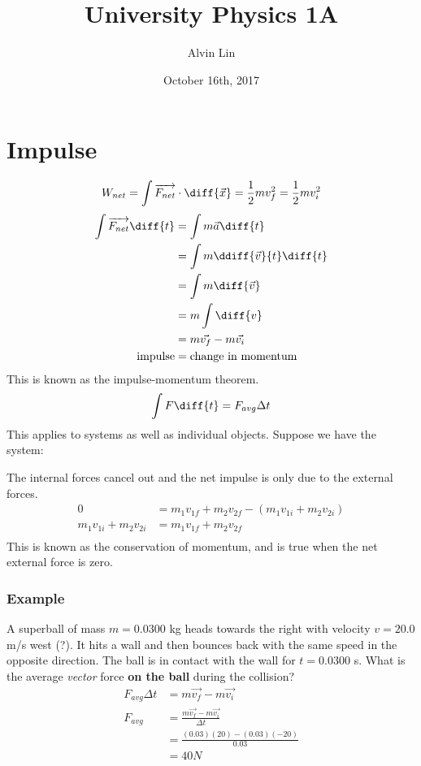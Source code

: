 \documentclass{math}
\title{University Physics 1A}
\author{Alvin Lin}
\date{October 16th, 2017}
\begin{document}
\maketitle

\section*{Impulse}
\[ W_{net} = \int\overrightarrow{F_{net}}\cdot\diff{\vec{x}} =
  \frac{1}{2}mv_f^2 = \frac{1}{2}mv_i^2 \]
\begin{align*}
  \int\overrightarrow{F_{net}}\diff{t} &= \int m\vec{a}\diff{t} \\
  &= \int m\ddiff{\vec{v}}{t}\diff{t} \\
  &= \int m\diff{\vec{v}} \\
  &= m\int\diff{v} \\
  &= m\vec{v_f}-m\vec{v_i} \\
  \text{impulse} &= \text{change in momentum}
\end{align*}
This is known as the impulse-momentum theorem.
\[ \int F\diff{t} = F_{avg}\Delta{t} \]
This applies to systems as well as individual objects. Suppose we have the
system:
\begin{center}
\end{center}
The internal forces cancel out and the net impulse is only due to the external
forces.
\begin{align*}
  0 &= m_1v_{1f}+m_2v_{2f}-(m_1v_{1i}+m_2v_{2i}) \\
  m_1v_{1i}+m_2v_{2i} &= m_1v_{1f}+m_2v_{2f} \\
\end{align*}
This is known as the conservation of momentum, and is true when the net
external force is zero.

\subsubsection*{Example}
A superball of mass \( m = 0.0300 \) kg heads towards the right with velocity
\( v = 20.0 \) m/s west (?). It hits a wall and then bounces back with the same
speed in the opposite direction. The ball is in contact with the wall for
\( t = 0.0300 \) s. What is the average \textit{vector} force \textbf{on the
ball} during the collision?
\begin{align*}
  F_{avg}\Delta{t} &= m\vec{v_f}-m\vec{v_i} \\
  F_{avg} &= \frac{m\vec{v_f}-m\vec{v_i}}{\Delta{t}} \\
  &= \frac{(0.03)(20)-(0.03)(-20)}{0.03} \\
  &= 40N
\end{align*}
\end{document}
